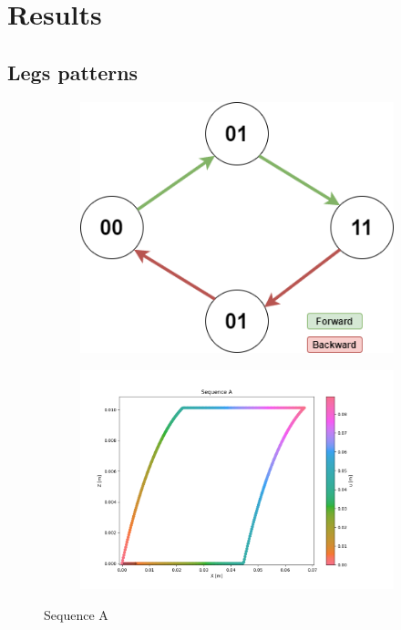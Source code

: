 \chapter{Results}

    \section{Legs patterns}
        \begin{figure}[h]
            \begin{subfigure}{.3\textwidth}
            \includegraphics[width=\textwidth]{images/Sequences-Sequence A.png}
            \end{subfigure}%
            \begin{subfigure}{.7\textwidth}
            \includegraphics[width=\textwidth]{images/A.png}
            \end{subfigure}
            \caption{Sequence A}
        \end{figure}
        
